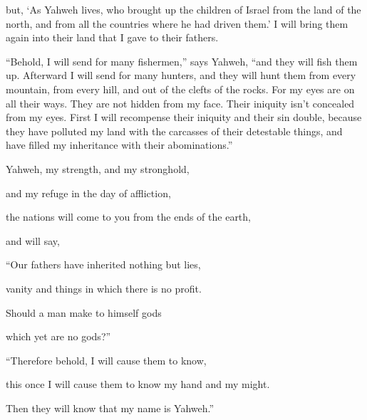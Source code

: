 {but, ‘As Yahweh lives, who brought up the children of Israel from the land of the north, and from all the countries where he had driven them.’ I will bring them again into their land that I gave to their fathers.
\par }{\PP {}“Behold, I will send for many fishermen,” says Yahweh, “and they will fish them up. Afterward I will send for many hunters, and they will hunt them from every mountain, from every hill, and out of the clefts of the rocks.
For my eyes are on all their ways. They are not hidden from my face. Their iniquity isn’t concealed from my eyes.
First I will recompense their iniquity and their sin double, because they have polluted my land with the carcasses of their detestable things, and have filled my inheritance with their abominations.”
\par }{\BB \par }{\Q {}Yahweh, my strength, and my stronghold,
\par }{\QB and my refuge in the day of affliction,
\par }{\Q the nations will come to you from the ends of the earth,
\par }{\QB and will say,
\par }{\Q “Our fathers have inherited nothing but lies,
\par }{\QB vanity and things in which there is no profit.
\par }{\Q {}Should a man make to himself gods
\par }{\QB which yet are no gods?”
\par }{\BB \par }{\Q {}“Therefore behold, I will cause them to know,
\par }{\QB this once I will cause them to know my hand and my might.
\par }{\QB Then they will know that my name is Yahweh.”

}
